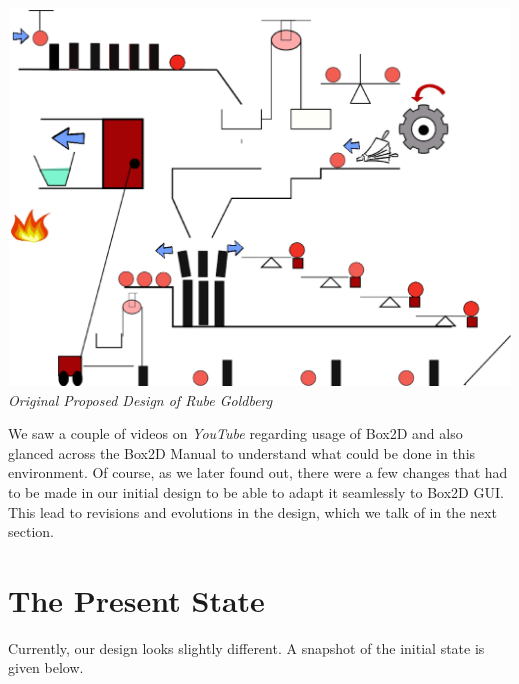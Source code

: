 \documentclass[a4paper,11pt]{article}
\begin{document}
\begin{center}
\includegraphics[width=160mm, height=100mm]{RubeGoldberg.eps}\\
\emph{Original Proposed Design of Rube Goldberg}
\end{center}

We saw a couple of videos on \emph{YouTube} regarding usage of Box2D and also glanced across the Box2D Manual to understand what could be done in this environment. Of course, as we later found out, there were a few changes that had to be made in our initial design to be able to adapt it seamlessly to Box2D GUI. This lead to revisions and evolutions in the design, which we talk of in the next section.

\section{The Present State}

Currently, our design looks slightly different. A snapshot of the initial state is given below.
\end{document}
